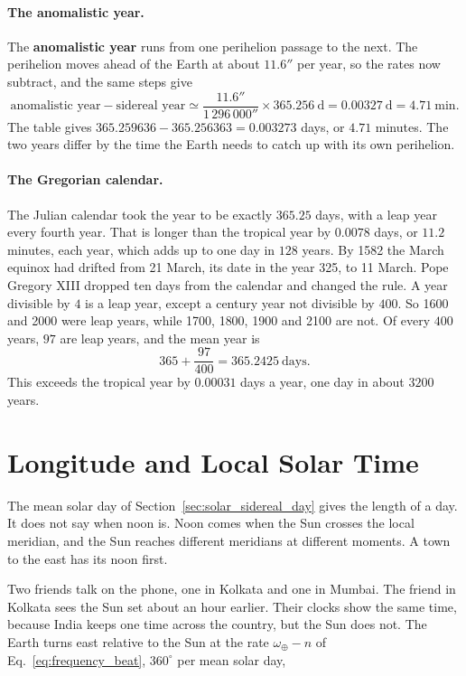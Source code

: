 \paragraph{The anomalistic year.} The \textbf{anomalistic year} runs from one perihelion passage to the next. The perihelion moves ahead of the Earth at about $11.6''$ per year, so the rates now subtract, and the same steps give
\[
\text{anomalistic year}-\text{sidereal year}\simeq\frac{11.6''}{1\,296\,000''}\times365.256\ \text{d}=0.00327\ \text{d}=4.71\ \text{min}.
\]
The table gives $365.259636-365.256363=0.003273$ days, or $4.71$ minutes. The two years differ by the time the Earth needs to catch up with its own perihelion.

\paragraph{The Gregorian calendar.} The Julian calendar took the year to be exactly $365.25$ days, with a leap year every fourth year. That is longer than the tropical year by $0.0078$ days, or $11.2$ minutes, each year, which adds up to one day in $128$ years. By 1582 the March equinox had drifted from 21 March, its date in the year 325, to 11 March. Pope Gregory XIII dropped ten days from the calendar and changed the rule. A year divisible by $4$ is a leap year, except a century year not divisible by $400$. So 1600 and 2000 were leap years, while 1700, 1800, 1900 and 2100 are not. Of every $400$ years, $97$ are leap years, and the mean year is
\[
365+\frac{97}{400}=365.2425\ \text{days}.
\]
This exceeds the tropical year by $0.00031$ days a year, one day in about $3200$ years.

\section{Longitude and Local Solar Time}
\label{ti:sec:longitude}

The mean solar day of Section~\ref{sec:solar_sidereal_day} gives the length of a day. It does not say when noon is. Noon comes when the Sun crosses the local meridian, and the Sun reaches different meridians at different moments. A town to the east has its noon first.

Two friends talk on the phone, one in Kolkata and one in Mumbai. The friend in Kolkata sees the Sun set about an hour earlier. Their clocks show the same time, because India keeps one time across the country, but the Sun does not. The Earth turns east relative to the Sun at the rate $\omega_\oplus-n$ of Eq.~\eqref{eq:frequency_beat}, $360^\circ$ per mean solar day,

